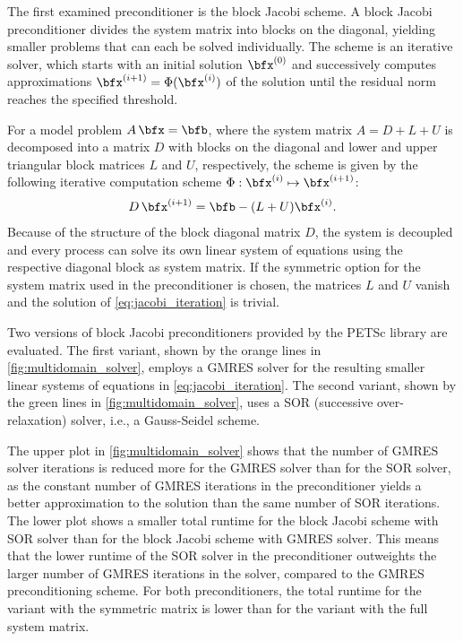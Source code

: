 The first examined preconditioner is the block Jacobi scheme.
A block Jacobi preconditioner divides the system matrix into blocks on the diagonal, yielding smaller problems that can each be solved individually.
The scheme is an iterative solver, which starts with an initial solution $\bfx^{(0)}$ and successively computes  approximations $\bfx^{(i+1)} = \Phi(\bfx^{(i)})$ of the solution until the residual norm reaches the specified threshold.

For a model problem $A\,\bfx = \bfb$, where the system matrix $A=D+L+U$ is decomposed into a matrix $D$ with blocks on the diagonal and lower and upper triangular block matrices $L$ and $U$, respectively, the scheme is given by the following iterative computation scheme $\Phi: \bfx^{(i)} \mapsto \bfx^{(i+1)}$:
\begin{align}\label{eq:jacobi_iteration}
  D\,\bfx^{(i+1)} = \bfb - (L+U)\bfx^{(i)}.
\end{align}
Because of the structure of the block diagonal matrix $D$, the system is decoupled and every process can solve its own linear system of equations using the respective diagonal block as system matrix. If the symmetric option for the system matrix used in the preconditioner is chosen, the matrices $L$ and $U$ vanish and the solution of \cref{eq:jacobi_iteration} is trivial.

Two versions of block Jacobi preconditioners provided by the PETSc library are evaluated.
The first variant, shown by the orange lines in \cref{fig:multidomain_solver}, employs a GMRES solver for the resulting smaller linear systems of equations in \cref{eq:jacobi_iteration}.
The second variant, shown by the green lines in \cref{fig:multidomain_solver}, uses a SOR (successive over-relaxation) solver, i.e., a Gauss-Seidel scheme.

The upper plot in \cref{fig:multidomain_solver} shows that the number of GMRES solver iterations is reduced more for the GMRES solver than for the SOR solver, as the constant number of GMRES iterations in the preconditioner yields a better approximation to the solution than the same number of SOR iterations. The lower plot shows a smaller total runtime for the block Jacobi scheme with SOR solver than for the block Jacobi scheme with GMRES solver. This means that the lower runtime of the SOR solver in the preconditioner outweights the larger number of GMRES iterations in the solver, compared to the GMRES preconditioning scheme. For both preconditioners, the total runtime for the variant with the symmetric matrix is lower than for the variant with the full system matrix.

